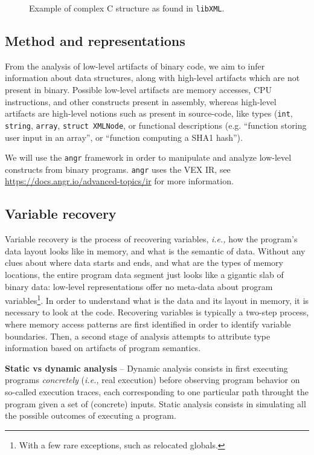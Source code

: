 \documentclass{article}
\begin{document}
\begin{figure}[!h]
	\centering
	\inputminted[xleftmargin=.1\linewidth, fontsize=\footnotesize, linenos, framesep=2mm, breaklines]{C}{xmlnode.h}
	\caption{Example of complex C structure as found in \texttt{libXML}.}
	\label{fig:xmlnode}
\end{figure}

\subsection{Method and representations}

From the analysis of low-level artifacts of binary code, we aim to infer information about data structures, along with high-level artifacts which are not present in binary. Possible low-level artifacts are memory accesses, CPU instructions, and other constructs present in assembly, whereas high-level artifacts are high-level notions such as present in source-code, like types (\texttt{int}, \texttt{string}, \texttt{array}, \texttt{struct XMLNode}, or functional descriptions (e.g. ``function storing user input in an array'', or ``function computing a SHA1 hash'').


We will use the \texttt{angr} framework in order to manipulate and analyze low-level constructs from binary programs. \texttt{angr} uses the VEX IR, see \url{https://docs.angr.io/advanced-topics/ir} for more information.

\subsection{Variable recovery}
Variable recovery is the process of recovering variables, \textit{i.e.,} how the program's data layout looks like in memory, and what is the semantic of data. Without any clues about where data starts and ends, and what are the types of memory locations, the entire program data segment just looks like a gigantic slab of binary data: low-level representations offer no meta-data about program variables\footnote{With a few rare exceptions, such as relocated globals.}. In order to understand what is the data and its layout in memory, it is necessary to look at the code. 
Recovering variables is typically a two-step process, where memory access patterns are first identified in order to identify variable boundaries. Then, a second stage of analysis attempts to attribute type information based on artifacts of program semantics. 

\textbf{Static vs dynamic analysis} -- 
Dynamic analysis consists in first executing programs \emph{concretely} (\textit{i.e.,} real execution) before observing program behavior on so-called execution traces, each corresponding to one particular path throught the program given a set of (concrete) inputs.
Static analysis consists in simulating all the possible outcomes of executing a program.
\end{document}
